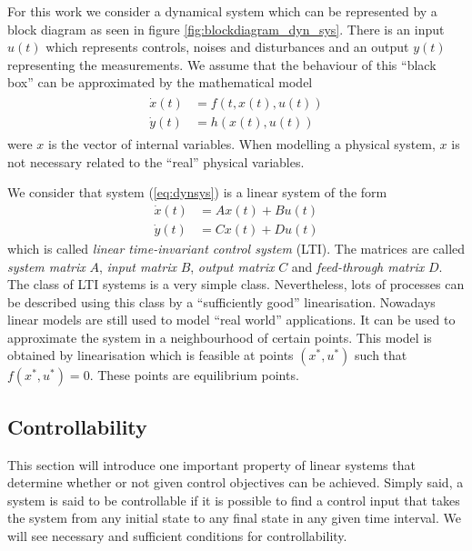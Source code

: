 For this work we consider a dynamical system which can be represented by a block diagram as seen in figure \ref{fig:blockdiagram_dyn_sys}. There is an input $u(t)$ which represents controls, noises and disturbances and an output $y(t)$ representing the measurements. We assume that the behaviour of this “black box” can be approximated by the mathematical model
\begin{align}\label{eq:dynsys}
	\begin{split}
		\dot{x}(t) &= f(t, x(t), u(t))\\
		\dot{y}(t) &= h(x(t), u(t))
	\end{split}
\end{align}
were $x$ is the vector of internal variables. When modelling a physical system, $x$ is not necessary related to the “real” physical variables.

We consider that system (\ref{eq:dynsys}) is a linear system of the form
\begin{align*}
	\dot{x}(t) &= Ax(t) + Bu(t)\\
	\dot{y}(t) &= Cx(t) + Du(t)
\end{align*}
which is called \emph{linear time-invariant control system} (LTI). The matrices are called \emph{system matrix} $A$, \emph{input matrix} $B$, \emph{output matrix} $C$ and \emph{feed-through matrix} $D$. The class of LTI systems is a very simple class. Nevertheless, lots of processes can be described using this class by a “sufficiently good” linearisation. Nowadays linear models are still used to model “real world” applications. It can be used to approximate the system in a neighbourhood of certain points. This model is obtained by linearisation which is feasible at points $(x^*,u^*)$ such that $f(x^*,u^*) = 0$. These points are equilibrium points.

\subsection{Controllability}

This section will introduce one important property of linear systems that determine whether or not given control objectives can be achieved. Simply said, a system is said to be controllable if it is possible to find a control input that takes the system from any initial state to any final state in any given time interval. We will see necessary and sufficient conditions for controllability.

